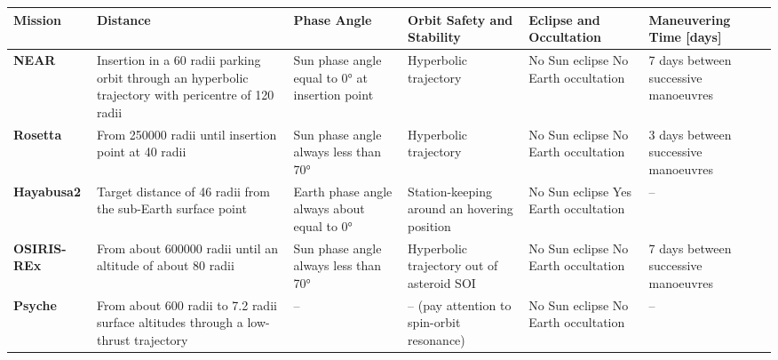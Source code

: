 \documentclass{Configuration_gigi/PoliMi3i_thesis}
\begin{document}
\begin{landscape}
\begin{table}[ht!]
\centering
\renewcommand{\arraystretch}{1.5}
\begin{tabular}{| >{\raggedright\arraybackslash}m{3cm} | >{\raggedright\arraybackslash}m{4cm} | >{\raggedright\arraybackslash}m{3.5cm} | >{\raggedright\arraybackslash}m{3.5cm} | >{\raggedright\arraybackslash}m{3.5cm} | >{\raggedright\arraybackslash}m{3.5cm} |}
\hline
\rowcolor{bluepoli!40}
\textbf{Mission} & \textbf{Distance } & \textbf{Phase Angle \newline [deg]} & \textbf{Orbit Safety and Stability} & \textbf{Eclipse and Occultation} & \textbf{Maneuvering Time [days]} \\
\hline\hline
\textbf{NEAR} & \footnotesize Insertion in a 60 radii parking orbit through an hyperbolic trajectory with pericentre of 120 radii & \footnotesize Sun phase angle equal to 0° at insertion point & \footnotesize Hyperbolic trajectory & \footnotesize No Sun eclipse \newline No Earth occultation & \footnotesize 7 days between successive manoeuvres \\
\hline
\textbf{Rosetta} & \footnotesize From 250000 radii until insertion point at 40 radii & \footnotesize Sun phase angle always less than 70° & \footnotesize Hyperbolic trajectory & \footnotesize No Sun eclipse \newline No Earth occultation & \footnotesize 3 days between successive manoeuvres \\
\hline
\textbf{Hayabusa2} & \footnotesize Target distance of 46 radii from the sub-Earth surface point & \footnotesize Earth phase angle always about equal to 0° & \footnotesize Station-keeping around an hovering position & \footnotesize No Sun eclipse \newline Yes Earth occultation & -- \\
\hline
\textbf{OSIRIS-REx} & \footnotesize From about 600000 radii until an altitude of about 80 radii & \footnotesize Sun phase angle always less than 70° & \footnotesize Hyperbolic trajectory out of asteroid SOI & \footnotesize No Sun eclipse \newline \footnotesize No Earth occultation & \footnotesize 7 days between successive manoeuvres \\
\hline
\textbf{Psyche} & \footnotesize From about 600 radii to 7.2 radii surface altitudes through a low-thrust trajectory & -- & -- \footnotesize (pay attention to spin-orbit resonance) & \footnotesize No Sun eclipse \newline No Earth occultation & -- \\

\end{tabular}
\end{table}
\end{landscape}
\end{document}
